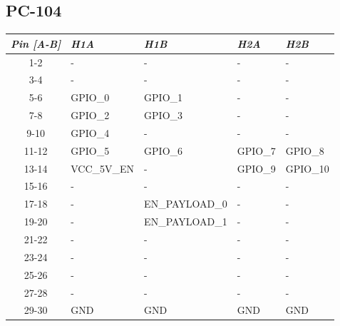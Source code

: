 \subsection{PC-104}

\begin{table}[!h]
    \centering
    \begin{tabular}{cllll}
        \toprule[1.5pt]
        \textit{Pin [A-B]} & \textit{H1A}     & \textit{H1B}     & \textit{H2A}  & \textit{H2B}  \\
        \midrule
        1-2                & -                & -                & -             & -             \\
        3-4                & -                & -                & -             & -             \\
        5-6                & GPIO\_0          & GPIO\_1          & -             & -             \\
        7-8                & GPIO\_2          & GPIO\_3          & -             & -             \\
        9-10               & GPIO\_4          & -                 & -            & -             \\
        11-12              & GPIO\_5          & GPIO\_6          & GPIO\_7       & GPIO\_8       \\
        13-14              & VCC\_5V\_EN      & -                & GPIO\_9       & GPIO\_10      \\
        15-16              & -                & -                & -             & -             \\
        17-18              & -                & EN\_PAYLOAD\_0   & -             & -             \\
        19-20              & -                & EN\_PAYLOAD\_1   & -             & -             \\
        21-22              & -                & -                & -             & -             \\
        23-24              & -                & -                & -             & -             \\
        25-26              & -                & -                & -             & -             \\
        27-28              & -                & -                & -             & -             \\
        29-30              & GND              & GND              & GND           & GND           \\

\end{tabular}
\end{table}
